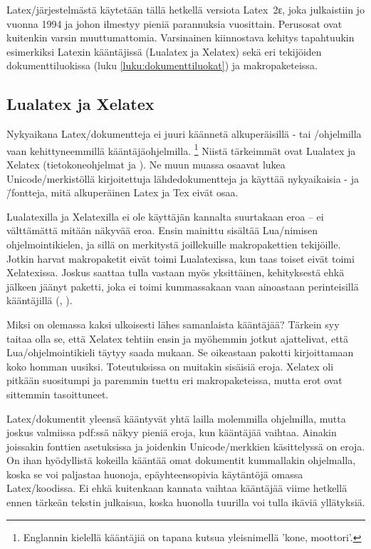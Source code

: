 Latex\-/järjestelmästä käytetään tällä hetkellä versiota Latex~2ε, joka
julkaistiin jo vuonna 1994 ja johon ilmestyy pieniä parannuksia
vuosittain. Perusosat ovat kuitenkin varsin muuttumattomia. Varsinainen
kiinnostava kehitys tapahtuukin esimerkiksi Latexin kääntäjissä
(Lualatex ja Xelatex) sekä eri tekijöiden dokumenttiluokissa (luku
\ref{luku:dokumenttiluokat}) ja makropaketeissa.

\subsection{Lualatex ja Xelatex}

Nyky\-aikana Latex\-/dokumentteja ei juuri käännetä alkuperäisillä
- tai \-/ohjelmilla vaan kehittyneemmillä
kään\-täjä\-ohjel\-milla.%
\footnote{Englannin kielellä kääntäjiä on tapana kutsua yleisnimellä
  \emph{} 'kone, moottori'.} Niistä tärkeimmät ovat
Lualatex ja Xelatex (tietokoneohjelmat  ja
). Ne muun muassa osaavat lukea Unicode\-/merkistöllä
kirjoitettuja lähdedokumentteja ja käyttää nyky\-aikaisia - ja  \=/fontteja, mitä alkuperäinen Latex ja
Tex eivät osaa.

Lualatexilla ja Xelatexilla ei ole käyttäjän kannalta suurtakaan eroa --
ei välttämättä mitään näkyvää eroa. Ensin mainittu sisältää
Lua\-/nimisen ohjelmointikielen, ja sillä on merkitystä joillekuille
makropakettien tekijöille. Jotkin harvat makropaketit eivät toimi
Lualatexissa, kun taas toiset eivät toimi Xelatexissa. Joskus saattaa
tulla vastaan myös yksittäinen, kehityksestä ehkä jälkeen jäänyt
paketti, joka ei toimi kummassakaan vaan ainoastaan perinteisillä
kääntäjillä (, ).

Miksi on olemassa kaksi ulkoisesti lähes samanlaista kääntäjää? Tärkein
syy taitaa olla se, että Xelatex tehtiin ensin ja myöhemmin jotkut
ajattelivat, että Lua\-/ohjelmointikieli täytyy saada mukaan. Se
oikeastaan pakotti kirjoittamaan koko homman uusiksi. Toteutuksissa on
muitakin sisäisiä eroja. Xelatex oli pitkään suositumpi ja paremmin
tuettu eri makropaketeissa, mutta erot ovat sittemmin tasoittuneet.

Latex\-/dokumentit yleensä kääntyvät yhtä lailla molemmilla ohjelmilla,
mutta joskus valmiissa pdf:ssä näkyy pieniä eroja, kun kääntäjää
vaihtaa. Ainakin joissakin fonttien asetuksissa ja joidenkin
Unicode\-/merkkien käsittelyssä on eroja. On ihan hyödyllistä kokeilla
kääntää omat dokumentit kummallakin ohjelmalla, koska se voi paljastaa
huonoja, epäyhteensopivia käytäntöjä omassa Latex\-/koodissa. Ei ehkä
kuitenkaan kannata vaihtaa kääntäjää viime hetkellä ennen tärkeän
tekstin julkaisua, koska huonolla tuurilla voi tulla ikäviä yllätyksiä.

